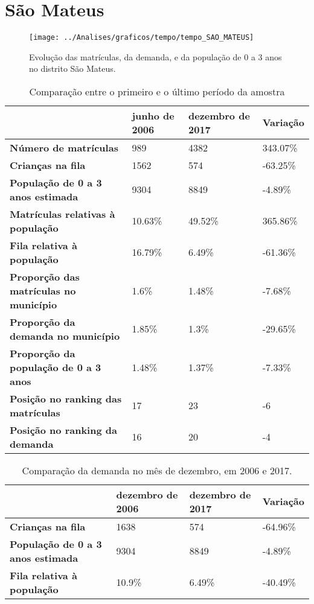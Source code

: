 \section{São Mateus}
\begin{figure}[H]
\centering
\texttt{[image: ../Analises/graficos/tempo/tempo\_SAO\_MATEUS]}
\caption{Evolução das matrículas, da demanda, e da população de 0 a 3 anos no distrito São Mateus.}
\end{figure}
\begin{table}[H]
\begin{tabular}{|l|l|l|l|}
\hline
\textbf{}                                      & \textbf{junho de 2006}       & \textbf{dezembro de 2017}    & \textbf{Variação} \\ \hline
\textbf{Número de matrículas}                  & 989 & 4382 & 343.07\% \\ \hline
\textbf{Crianças na fila}                      & 1562 & 574 & -63.25\% \\ \hline
\textbf{População de 0 a 3 anos estimada}      & 9304 & 8849 & -4.89\% \\ \hline
\textbf{Matrículas relativas à população}      & 10.63\% & 49.52\% & 365.86\% \\ \hline
\textbf{Fila relativa à população}             & 16.79\% & 6.49\% & -61.36\% \\ \hline
\textbf{Proporção das matrículas no município} & 1.6\% & 1.48\% & -7.68\% \\ \hline
\textbf{Proporção da demanda no município}     & 1.85\% & 1.3\% & -29.65\% \\ \hline
\textbf{Proporção da população de 0 a 3 anos}  & 1.48\% & 1.37\% & -7.33\% \\ \hline
\textbf{Posição no ranking das matrículas}     & 17 & 23 & -6 \\ \hline
\textbf{Posição no ranking da demanda}         & 16 & 20 & -4 \\ \hline
\end{tabular}
\caption{Comparação entre o primeiro e o último período da amostra}
\end{table}
\begin{table}[H]
\begin{tabular}{|l|l|l|l|}
\hline
\textbf{}                                 & \textbf{dezembro de 2006} & \textbf{dezembro de 2017} & \textbf{Variação} \\ \hline
\textbf{Crianças na fila}                      & 1638 & 574 & -64.96\% \\ \hline
\textbf{População de 0 a 3 anos estimada}      & 9304 & 8849 & -4.89\% \\ \hline
\textbf{Fila relativa à população}             & 10.9\% & 6.49\% & -40.49\% \\ \hline
\end{tabular}
\caption{Comparação da demanda no mês de dezembro, em 2006 e 2017.}
\end{table}
